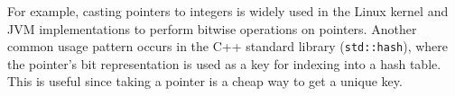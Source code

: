 For example, casting pointers to integers is
widely used in the Linux kernel and JVM implementations to perform bitwise operations on pointers.
Another common usage pattern occurs in the C++ standard library (\texttt{std::hash}),
where the pointer's bit representation is used as a key for indexing into
a hash table.
This is useful since taking a pointer is a cheap way to get a unique key.


%






